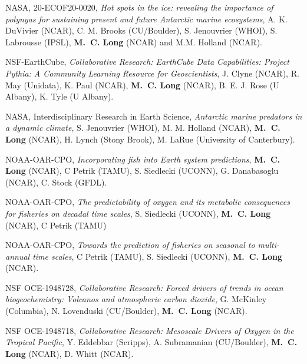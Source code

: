 \documentclass[11pt]{article}
\begin{document}
\begin{description}[style=multiline,leftmargin=2.5cm,font=\normalfont]

\item[2021--2024] NASA, 20-ECOF20-0020,
\textit{Hot spots in the ice: revealing the importance of polynyas for sustaining present and future Antarctic marine ecosystems},
A. K. DuVivier (NCAR), C. M. Brooks (CU/Boulder), S. Jenouvrier (WHOI), S. Labrousse (IPSL), \textbf{M.~C. Long} (NCAR) and M.M. Holland (NCAR).

\item[2021-2024] NSF-EarthCube,
\textit{Collaborative Research: EarthCube Data Capabilities: Project Pythia: A Community Learning Resource for Geoscientists},
J. Clyne (NCAR), R. May (Unidata), K. Paul (NCAR), \textbf{M.~C. Long}  (NCAR), B. E. J. Rose (U Albany), K. Tyle (U Albany).

\item[2021--2024] NASA, Interdisciplinary Research in Earth Science,
\textit{Antarctic marine predators in a dynamic climate},
S. Jenouvrier (WHOI), M. M. Holland (NCAR), \textbf{M.~C. Long} (NCAR), H. Lynch (Stony Brook), M. LaRue (University of Canterbury).

\item[2020--2023] NOAA-OAR-CPO,
\textit{Incorporating fish into Earth system predictions},
\textbf{M.~C. Long} (NCAR), C Petrik (TAMU), S. Siedlecki (UCONN), G. Danabasoglu (NCAR), C. Stock (GFDL).

\item[2020--2023] NOAA-OAR-CPO,
\textit{The predictability of oxygen and its metabolic consequences for fisheries on decadal time scales},
S. Siedlecki (UCONN), \textbf{M.~C. Long} (NCAR), C Petrik (TAMU)

\item[2020--2023] NOAA-OAR-CPO,
\textit{Towards the prediction of fisheries on seasonal to multi-annual time scales},
C Petrik (TAMU), S. Siedlecki (UCONN), \textbf{M.~C. Long} (NCAR).

\item[2020--2023] NSF OCE-1948728,
\textit{Collaborative Research: Forced drivers of trends in ocean biogeochemistry: Volcanos and atmospheric carbon dioxide},
G. McKinley (Columbia), N. Lovenduski (CU/Boulder), \textbf{M.~C. Long} (NCAR).

\item[2020--2023] NSF OCE-1948718,
\textit{Collaborative Research: Mesoscale Drivers of Oxygen in the Tropical Pacific}, Y. Eddebbar (Scripps), A. Subramanian (CU/Boulder),
\textbf{M.~C. Long} (NCAR), D. Whitt (NCAR).


\end{description}
\end{document}
